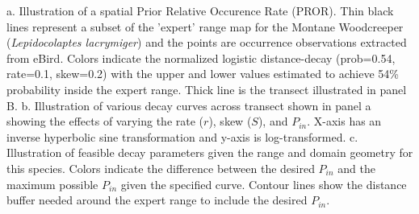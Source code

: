 a. Illustration of a spatial Prior Relative Occurence Rate (PROR).  Thin black lines represent a subset of the 'expert' range map for the Montane Woodcreeper (\textit{Lepidocolaptes lacrymiger}) and the points are occurrence observations extracted from eBird.  Colors indicate the normalized logistic distance-decay (prob=0.54, rate=0.1, skew=0.2) with the upper and lower values estimated to achieve 54\% probability inside the expert range. Thick line is the transect illustrated in panel B.  b. Illustration of various decay curves across transect shown in panel a showing the effects of varying the rate ($r$), skew ($S$), and $P_{in}$. X-axis has an inverse hyperbolic sine transformation and y-axis is log-transformed.   c. Illustration of feasible decay parameters given the range and domain geometry for this species.  Colors indicate the difference between the desired $P_{in}$ and the maximum possible  $P_{in}$ given the specified curve.  Contour lines show the distance buffer needed around the expert range to include the desired  $P_{in}$.
  